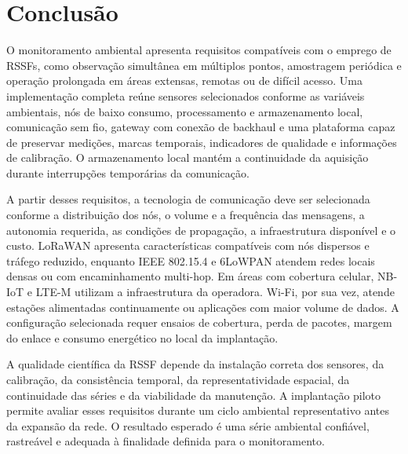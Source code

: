 \section{Conclusão}

O monitoramento ambiental apresenta requisitos compatíveis com o emprego de \acp{RSSF}, como observação simultânea em múltiplos pontos, amostragem periódica e operação prolongada em áreas extensas, remotas ou de difícil acesso. Uma implementação completa reúne sensores selecionados conforme as variáveis ambientais, nós de baixo consumo, processamento e armazenamento local, comunicação sem fio, gateway com conexão de backhaul e uma plataforma capaz de preservar medições, marcas temporais, indicadores de qualidade e informações de calibração. O armazenamento local mantém a continuidade da aquisição durante interrupções temporárias da comunicação.

A partir desses requisitos, a tecnologia de comunicação deve ser selecionada conforme a distribuição dos nós, o volume e a frequência das mensagens, a autonomia requerida, as condições de propagação, a infraestrutura disponível e o custo. LoRaWAN apresenta características compatíveis com nós dispersos e tráfego reduzido, enquanto IEEE 802.15.4 e 6LoWPAN atendem redes locais densas ou com encaminhamento multi-hop. Em áreas com cobertura celular, NB-IoT e LTE-M utilizam a infraestrutura da operadora. Wi-Fi, por sua vez, atende estações alimentadas continuamente ou aplicações com maior volume de dados. A configuração selecionada requer ensaios de cobertura, perda de pacotes, margem do enlace e consumo energético no local da implantação.

A qualidade científica da RSSF depende da instalação correta dos sensores, da calibração, da consistência temporal, da representatividade espacial, da continuidade das séries e da viabilidade da manutenção. A implantação piloto permite avaliar esses requisitos durante um ciclo ambiental representativo antes da expansão da rede. O resultado esperado é uma série ambiental confiável, rastreável e adequada à finalidade definida para o monitoramento.